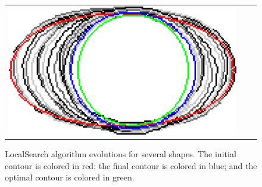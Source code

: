 \begin{figure}[hp!]
\begin{tabular}{ccc}
	\includegraphics[scale=0.25]{figures/chapter5/flow/ellipse/radius_5/ii/elastica/len_pen_0.01000/jonctions_1/curve_segs_4/best/gs_0.25000/summary.pdf}				
\end{tabular}
		\caption{LocalSearch algorithm evolutions for several shapes. The initial contour is colored in red; the final contour is colored in blue; and the optimal contour is colored in green.}	
		\label{fig:local-comb-ii5-results}
\end{figure}

